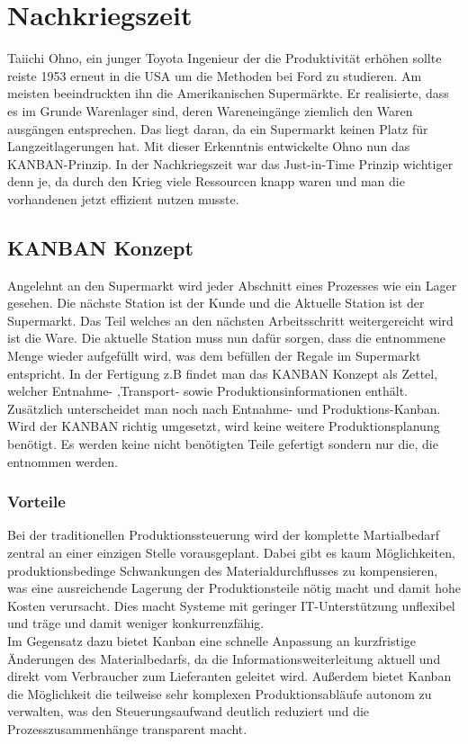 \documentclass[00_ToyotaProduktionssystem.tex]{subfiles}
\begin{document}
\section{Nachkriegszeit}
Taiichi Ohno, ein junger Toyota Ingenieur der die Produktivität erhöhen sollte reiste 1953 erneut in die USA um die Methoden bei Ford zu studieren. Am meisten beeindruckten ihn die Amerikanischen Supermärkte. Er realisierte, dass es im Grunde Warenlager sind, deren Wareneingänge ziemlich den Waren ausgängen entsprechen. Das liegt daran, da ein Supermarkt keinen Platz für Langzeitlagerungen hat. Mit dieser Erkenntnis entwickelte Ohno nun das KANBAN-Prinzip. In der Nachkriegszeit war das Just-in-Time Prinzip wichtiger denn je, da durch den Krieg viele Ressourcen knapp waren und man die vorhandenen jetzt effizient nutzen musste.
\subsection{KANBAN Konzept}
Angelehnt an den Supermarkt wird jeder Abschnitt eines Prozesses wie ein Lager gesehen. Die nächste Station ist der Kunde und die Aktuelle Station ist der Supermarkt. Das Teil welches an den nächsten Arbeitsschritt weitergereicht wird ist die Ware. Die aktuelle Station muss nun dafür sorgen, dass die entnommene Menge wieder aufgefüllt wird, was dem befüllen der Regale im Supermarkt entspricht.
In der Fertigung z.B findet man das KANBAN Konzept als Zettel, welcher Entnahme- ,Transport- sowie Produktionsinformationen enthält.
Zusätzlich unterscheidet man noch nach Entnahme- und Produktions-Kanban.
Wird der KANBAN richtig umgesetzt, wird keine weitere Produktionsplanung benötigt. Es werden keine nicht benötigten Teile gefertigt sondern nur die, die entnommen werden.
\subsubsection{Vorteile}
Bei der traditionellen Produktionssteuerung wird der komplette Martialbedarf zentral an einer einzigen Stelle vorausgeplant. Dabei gibt es kaum Möglichkeiten, produktionsbedinge Schwankungen des Materialdurchflusses zu kompensieren, was eine ausreichende Lagerung der Produktionsteile nötig macht und damit hohe Kosten verursacht. Dies macht Systeme mit geringer IT-Unterstützung unflexibel und träge und damit weniger konkurrenzfähig.\\
Im Gegensatz dazu bietet Kanban eine schnelle Anpassung an kurzfristige Änderungen des Materialbedarfs, da die Informationsweiterleitung aktuell und direkt vom Verbraucher zum Lieferanten geleitet wird. Außerdem bietet Kanban die Möglichkeit die teilweise sehr komplexen Produktionsabläufe autonom zu verwalten, was den Steuerungsaufwand deutlich reduziert und die Prozesszusammenhänge transparent macht.
\end{document}
